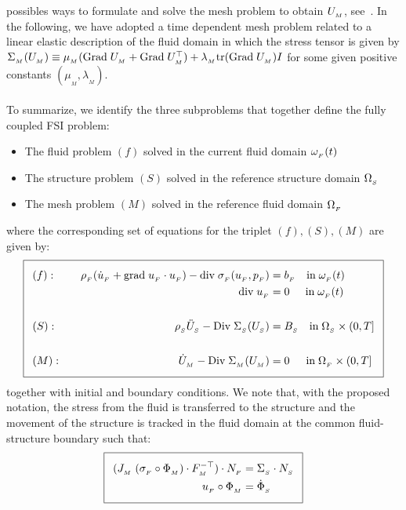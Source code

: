 possibles ways to formulate and solve the mesh problem to obtain
$U_{_{M}}$, see~\cite{HermanssonHansbo2003, LopezNigroEtAl2008}.  In the
following, we have adopted a time dependent mesh problem related to a
linear elastic description of the fluid domain in which the stress
tensor is given by $\Sigma_{_{M}}(U_{_{M}})\equiv \mu_{{_M}}(\textrm{Grad}\;U_{_{M}} +
\textrm{Grad}\;U_{_{M}}^{\top})+ \lambda_{_{M}}\textrm{tr}(\textrm{Grad}\;U_{_{M}})I$ for some given
positive constants $(\mu_{{_M}},\lambda_{_{M}})$.
\\\\
To summarize, we identify the three subproblems that together define
the fully coupled FSI problem:
\begin{itemize}
\item
The fluid problem $(f)$ solved in the current fluid domain $\omega_{_{F}}(t)$
\item
The structure problem $(S)$ solved in the reference structure domain
$\Omega_{_{S}}$
\item
The mesh problem $(M)$ solved in the reference fluid domain $\Omega_{_{F}}$
\end{itemize}
where the corresponding set of equations for the triplet
$(f),(S),(M)$ are given by:
\begin{equation}
  \addtolength{\fboxsep}{5pt} \boxed{
    \begin{split}\label{selim:eq:FSIsystem}
   &(f):&\quad \rhoF(\dotuF + \graduF\cdot\uF) -
      \divv\sigmaF(\uF,\pF) =\;& \bff \quad
      \textrm{in}\;\oF(t)\\ &&\divv\uF =\;&
      0\:\:\quad\textrm{in}\;\oF(t) \\\\ &(S):&\quad \rhoS \ddotUS -
      \Divv \SigmaS(\US) =\;& \BS \quad \textrm{in}\; \OS\times
      (0,T]\\\\ &(M):&\quad \dot{U}_{_{M}} - \Divv \SigmaM(\UM) =\;& 0
  \;\:\quad\textrm{in}\; \OF\times (0,T]
    \end{split}
  }
\end{equation}
together with initial and boundary conditions. We note that, with the
proposed notation, the stress from the fluid is transferred to the
structure and the movement of the structure is tracked in the fluid
domain at the common fluid-structure boundary such that:
\begin{equation}
  \addtolength{\fboxsep}{5pt} \boxed{
    \begin{split}\label{selim:eq:ALEtraction}
    (J_{_{M}}\;(\sigmaF\circ\PhiM) \cdot F_{_{M}}^{-\top})\cdot N_{_{F}}
      &= \SigmaS\cdot N_{_{S}}\\ \uF\circ\PhiM &= \dot{\Phi}_{_{S}} 
    \end{split}
  }
\end{equation}
